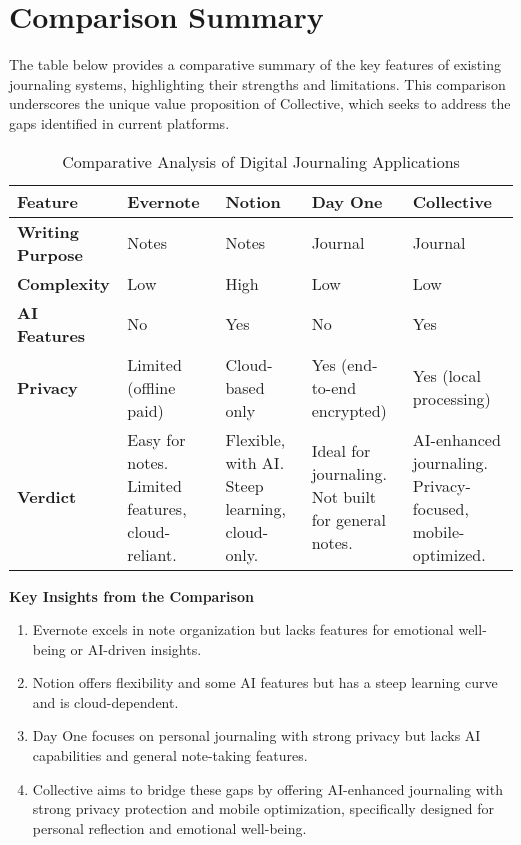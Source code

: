 \section{Comparison Summary}\label{sec:comparison}

The table below provides a comparative summary of the key features of existing journaling systems, highlighting their strengths and limitations. This comparison underscores the unique value proposition of Collective, which seeks to address the gaps identified in current platforms.

\begin{table}[H]
\centering
\caption{Comparative Analysis of Digital Journaling Applications}
\label{tab:app-comparison}
\begin{tabular}{|p{3cm}|p{2.5cm}|p{2.5cm}|p{2.5cm}|p{2.5cm}|}
\hline
\textbf{Feature} & \textbf{Evernote} & \textbf{Notion} & \textbf{Day One} & \textbf{Collective} \\
\hline
\textbf{Writing Purpose} & Notes & Notes & Journal & Journal \\
\hline
\textbf{Complexity} & Low & High & Low & Low \\
\hline
\textbf{AI Features} & No & Yes & No & Yes \\
\hline
\textbf{Privacy} & Limited (offline paid) & Cloud-based only & Yes (end-to-end encrypted) & Yes (local processing) \\
\hline
\textbf{Verdict} & Easy for notes. Limited features, cloud-reliant. & Flexible, with AI. Steep learning, cloud-only. & Ideal for journaling. Not built for general notes. & AI-enhanced journaling. Privacy-focused, mobile-optimized. \\
\hline
\end{tabular}
\end{table}

\textbf{Key Insights from the Comparison}

\begin{enumerate}
	\item Evernote excels in note organization but lacks features for emotional well-being or AI-driven insights.
	
	\item Notion offers flexibility and some AI features but has a steep learning curve and is cloud-dependent.
	
	\item Day One focuses on personal journaling with strong privacy but lacks AI capabilities and general note-taking features.
	
	\item Collective aims to bridge these gaps by offering AI-enhanced journaling with strong privacy protection and mobile optimization, specifically designed for personal reflection and emotional well-being.
\end{enumerate}

